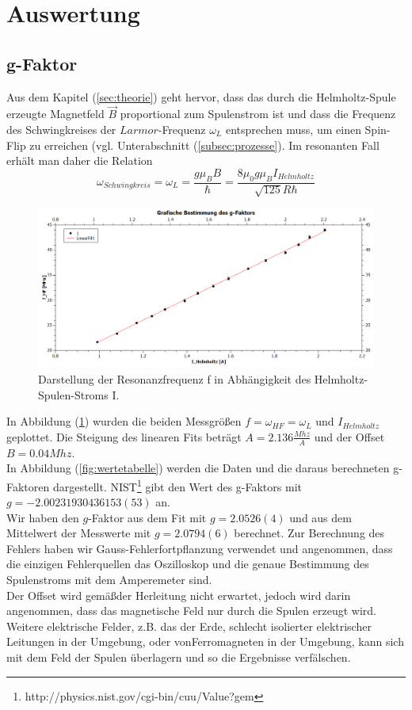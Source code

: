 \documentclass[a4paper,10pt]{scrartcl} %
\begin{document}
\section{Auswertung}
\label{sec:auswertung}
\subsection{g-Faktor}
\label{subsec:g-Faktor}
Aus dem Kapitel (\ref{sec:theorie}) geht hervor, dass das durch die Helmholtz-Spule erzeugte Magnetfeld $\vec{B}$ proportional zum Spulenstrom ist und dass die Frequenz des Schwingkreises der $Larmor$-Frequenz $\omega _L$ entsprechen muss, um einen Spin-Flip zu erreichen (vgl. Unterabschnitt (\ref{subsec:prozesse}). Im resonanten Fall erhält man daher die Relation
\begin{equation}
\label{eqn:Auswertung-g-faktor}
\omega _{Schwingkreis} = \omega _L = \frac{g \mu _B B}{\hbar} =  \frac{8 \mu _0 g \mu _B I_{Helmholtz}}{\sqrt{125} R \hbar}
\end{equation}
\begin{figure}
\label{fig:g-faktor-slope}
\includegraphics[width=\textwidth]{Daten/g-faktor.png}
\caption{Darstellung der Resonanzfrequenz f in Abhängigkeit des Helmholtz-Spulen-Stroms I.}
\end{figure}
In Abbildung (\ref{fig:g-faktor-slope}) wurden die beiden Messgrö\ss en $f = \omega _{HF} = \omega _L$ und $I_{Helmholtz}$ geplottet. Die Steigung des linearen Fits beträgt $A = 2.136 \frac{Mhz}{A}$ und der Offset $B = 0.04 Mhz$.\\
In Abbildung (\ref{fig:wertetabelle}) werden die Daten und die daraus berechneten g-Faktoren dargestellt. NIST\footnote{http://physics.nist.gov/cgi-bin/cuu/Value?gem} gibt den Wert des g-Faktors mit $g = -2.002 319 304 361 53(53)$ an.\\
Wir haben den $g$-Faktor aus dem Fit mit $g = 2.0526(4)$ und aus dem Mittelwert der Messwerte mit $g = 2.0794(6)$ berechnet. Zur Berechnung des Fehlers haben wir Gauss-Fehlerfortpflanzung verwendet und angenommen, dass die einzigen Fehlerquellen das Oszilloskop und die genaue Bestimmung des Spulenstroms mit dem Amperemeter sind.\\
Der Offset wird gemä\ss der Herleitung nicht erwartet, jedoch wird darin angenommen, dass das magnetische Feld nur durch die Spulen erzeugt wird. Weitere elektrische Felder, z.B. das der Erde, schlecht isolierter elektrischer Leitungen in der Umgebung, oder vonFerromagneten in der Umgebung, kann sich mit dem Feld der Spulen überlagern und so die Ergebnisse verfälschen.
\end{document}
